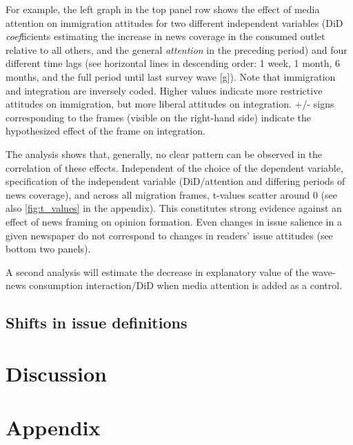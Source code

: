 \documentclass{article}
\begin{document}
For example, the left graph in the top panel row shows the effect of media attention on immigration attitudes for two different independent variables (DiD \textit{coef}ficients estimating the increase in news coverage in the consumed outlet relative to all others, and the general \textit{attention} in the preceding period) and four different time lags (see horizontal lines in descending order: 1 week, 1 month, 6 months, and the full period until last survey wave [g]). Note that immigration and integration are inversely coded. Higher values indicate more restrictive attitudes on immigration, but more liberal attitudes on integration. +/- signs corresponding to the frames (visible on the right-hand side) indicate the hypothesized effect of the frame on integration.

The analysis shows that, generally, no clear pattern can be observed in the correlation of these effects. Independent of the choice of the dependent variable, specification of the independent variable (DiD/attention and differing periods of news coverage), and across all migration frames, t-values scatter around 0 (see also \ref{fig:t_values} in the appendix). This constitutes strong evidence against an effect of news framing on opinion formation. Even changes in issue salience in a given newspaper do not correspond to changes in readers' issue attitudes (see bottom two panels).

A second analysis will estimate the decrease in explanatory value of the wave-news consumption interaction/DiD when media attention is added as a control.

\subsection{Shifts in issue definitions}


\section{Discussion}

\section{Appendix}
\end{document}
